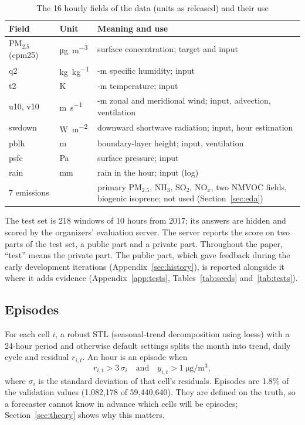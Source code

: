 \documentclass[journal]{IEEEtran}
\newcommand{\ugm}{\si{\micro\gram\per\cubic\metre}}
\newcommand{\PM}{PM$_{2.5}$}
\begin{document}
\begin{table}[!htb]
\centering
\caption{The 16 hourly fields of the data (units as released) and their use}
\label{tab:fields}
\setlength{\tabcolsep}{3pt}
\begin{tabular}{@{}ll>{\raggedright\arraybackslash}p{}@{}}
\toprule
Field & Unit & Meaning and use \\
\midrule
\PM{} (cpm25) & \ugm & surface concentration; target and input \\
q2 & \si{\kilo\gram\per\kilo\gram} & 2-m specific humidity; input \\
t2 & K & 2-m temperature; input \\
u10, v10 & \si{\metre\per\second} & 10-m zonal and meridional wind; input, advection, ventilation \\
swdown & \si{\watt\per\square\metre} & downward shortwave radiation; input, hour estimation \\
pblh & m & boundary-layer height; input, ventilation \\
psfc & Pa & surface pressure; input \\
rain & mm & rain in the hour; input (log) \\
7 emissions & & primary \PM, NH$_3$, SO$_2$, NO$_x$, two NMVOC fields, biogenic isoprene; not used (Section~\ref{sec:eda}) \\
\bottomrule
\end{tabular}
\end{table}

The test set is 218 windows of 10 hours from 2017; its answers are hidden and scored by the organizers' evaluation server. The server reports the score on two parts of the test set, a public part and a private part. Throughout the paper, ``test'' means the private part. The public part, which gave feedback during the early development iterations (Appendix~\ref{sec:history}), is reported alongside it where it adds evidence (Appendix~\ref{app:tests}, Tables~\ref{tab:seeds} and~\ref{tab:tests}).

\subsection{Episodes}
For each cell $i$, a robust STL (seasonal-trend decomposition using loess) \cite{cleveland1990} with a 24-hour period and otherwise default settings splits the month into trend, daily cycle and residual $r_{i,t}$. An hour is an episode when
\begin{equation}
r_{i,t} > 3\,\sigma_i \quad\text{and}\quad y_{i,t} > 1~\ugm,
\end{equation}
where $\sigma_i$ is the standard deviation of that cell's residuals. Episodes are 1.8\% of the validation values (1{,}082{,}178 of 59{,}440{,}640). They are defined on the truth, so a forecaster cannot know in advance which cells will be episodes; Section~\ref{sec:theory} shows why this matters.
\end{document}
